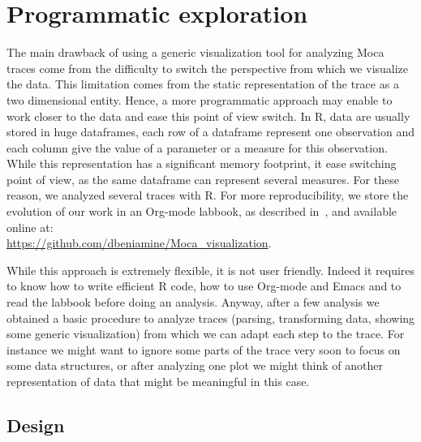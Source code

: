 \section{Programmatic exploration}
\label{sec:visu-second}

The main drawback of using a generic visualization tool for analyzing \gls{Moca} traces come from the difficulty to switch the perspective from which we visualize the data.
This limitation comes from the static representation of the trace as a two dimensional entity.
Hence, a more programmatic approach may enable to work closer to the data and ease this point of view switch.
In \gls{R}, data are usually stored in huge dataframes, each row of a dataframe represent one observation and each column give the value of a parameter or a measure for this observation.
While this representation has a significant memory footprint, it ease switching point of view, as the same dataframe can represent several measures.
For these reason, we analyzed several traces with \gls{R}.
For more reproducibility, we store the evolution of our work in an \gls{Org-mode} labbook, as described in~\cite[Chapter~4, p~54]{Stanisic15Reproducible}, and available online at:\\
\url{https://github.com/dbeniamine/Moca\_visualization}.

While this approach is extremely flexible, it is not user friendly.
Indeed it requires to know how to write efficient \gls{R} code, how to use \gls{Org-mode} and Emacs and to read the labbook before doing an analysis.
Anyway, after a few analysis we obtained a basic procedure to analyze traces (parsing, transforming data, showing some generic visualization) from which we can adapt each step to the trace.
For instance we might want to ignore some parts of the trace very soon to focus on some data structures, or after analyzing one plot we might think of another representation of data that might be meaningful in this case.

\subsection{Design}

